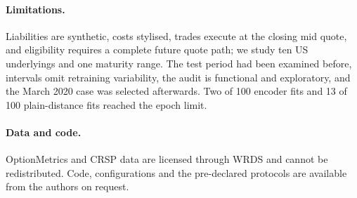 \documentclass[runningheads]{llncs}
\begin{document}
\paragraph{Limitations.} Liabilities are synthetic, costs stylised, trades execute at the closing mid quote, and eligibility
requires a complete future quote path; we study ten US underlyings and one maturity range. The test period
had been examined before, intervals omit retraining variability, the audit is functional and exploratory,
and the March 2020 case was selected afterwards. Two of 100 encoder fits and 13 of 100 plain-distance fits
reached the epoch limit.

\paragraph{Data and code.} OptionMetrics and CRSP data are licensed through WRDS and cannot be
redistributed. Code, configurations and the pre-declared protocols are available from the authors on
request.



\end{document}
